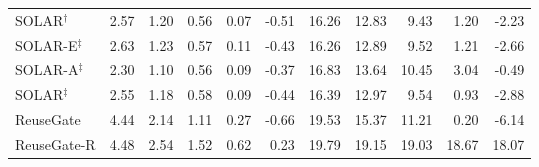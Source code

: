 \begin{tabular}{lrrrrr|rrrrr}
SOLAR$^{\dagger}$ & 2.57 & 1.20 & 0.56 & 0.07 & -0.51 & 16.26 & 12.83 & 9.43 & 1.20 & -2.23\\
SOLAR-E$^{\ddagger}$ & 2.63 & 1.23 & 0.57 & 0.11 & -0.43 & 16.26 & 12.89 & 9.52 & 1.21 & -2.66\\
SOLAR-A$^{\ddagger}$ & 2.30 & 1.10 & 0.56 & 0.09 & -0.37 & 16.83 & 13.64 & 10.45 & 3.04 & -0.49\\
SOLAR$^{\ddagger}$ & 2.55 & 1.18 & 0.58 & 0.09 & -0.44 & 16.39 & 12.97 & 9.54 & 0.93 & -2.88\\
ReuseGate & 4.44 & 2.14 & 1.11 & 0.27 & -0.66 & 19.53 & 15.37 & 11.21 & 0.20 & -6.14\\
ReuseGate-R & 4.48 & 2.54 & 1.52 & 0.62 & 0.23 & 19.79 & 19.15 & 19.03 & 18.67 & 18.07\\
\bottomrule
\end{tabular}
